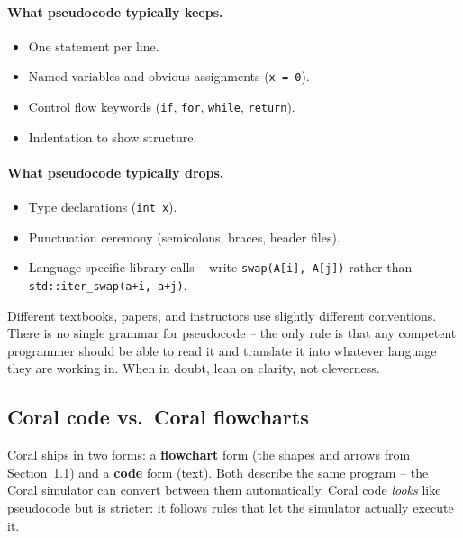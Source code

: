 \documentclass[11pt]{article}
\begin{document}
\paragraph{What pseudocode typically keeps.}
\begin{itemize}
    \item One statement per line.
    \item Named variables and obvious assignments (\texttt{x = 0}).
    \item Control flow keywords (\texttt{if}, \texttt{for}, \texttt{while},
          \texttt{return}).
    \item Indentation to show structure.
\end{itemize}

\paragraph{What pseudocode typically drops.}
\begin{itemize}
    \item Type declarations (\texttt{int x}).
    \item Punctuation ceremony (semicolons, braces, header files).
    \item Language-specific library calls -- write
          \texttt{swap(A[i], A[j])} rather than
          \texttt{std::iter\_swap(a+i, a+j)}.
\end{itemize}

\begin{warnbox}
Different textbooks, papers, and instructors use slightly different
conventions. There is no single grammar for pseudocode -- the only rule
is that any competent programmer should be able to read it and translate
it into whatever language they are working in. When in doubt, lean on
clarity, not cleverness.
\end{warnbox}

\subsection{Coral code vs.\ Coral flowcharts}

Coral ships in two forms: a \textbf{flowchart} form (the shapes and
arrows from Section~1.1) and a \textbf{code} form (text). Both describe
the same program -- the Coral simulator can convert between them
automatically. Coral code \emph{looks} like pseudocode but is stricter:
it follows rules that let the simulator actually execute it.
\end{document}
